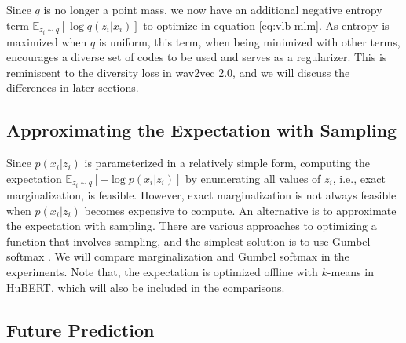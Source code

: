 \documentclass[11pt,a4paper]{article}
\begin{document}
Since $q$ is no longer a point mass, we now have an additional negative entropy term $\mathbb{E}_{z_i \sim q}[\log q(z_i | x_i)]$ to optimize in equation \ref{eq:vlb-mlm}.
As entropy is maximized when $q$ is uniform, this term, when being minimized with other terms, encourages a diverse set of codes to be used and serves as a regularizer.
This is reminiscent to the diversity loss in wav2vec 2.0, and we will discuss the differences in later sections.

\subsection{Approximating the Expectation with Sampling}

Since $p(x_i | z_i)$ is parameterized in a relatively simple form, computing the expectation $\mathbb{E}_{z_i \sim q}[-\log p(x_i | z_i)]$ by enumerating all values of $z_i$, i.e., exact marginalization, is feasible.
However, exact marginalization is not always feasible when $p(x_i | z_i)$ becomes expensive to compute.
An alternative is to approximate the expectation with sampling.
There are various approaches to optimizing a function that involves sampling, and the simplest solution is to use Gumbel softmax \citep{jang2016categorical}.
We will compare marginalization and Gumbel softmax in the experiments.
Note that, the expectation is optimized offline with $k$-means in HuBERT, which will also be included in the comparisons.

\subsection{Future Prediction}
\label{sec:futurepred}
\end{document}

